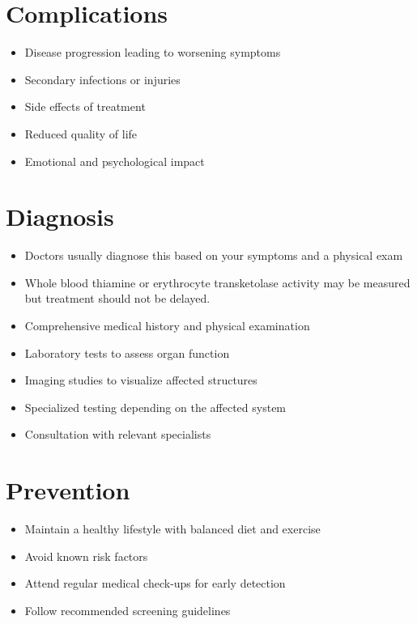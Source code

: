 \section{Complications}
\begin{itemize}[noitemsep]
  \item Disease progression leading to worsening symptoms
  \item Secondary infections or injuries
  \item Side effects of treatment
  \item Reduced quality of life
  \item Emotional and psychological impact
\end{itemize}
\section{Diagnosis}
\begin{itemize}[noitemsep]
  \item Doctors usually diagnose this based on your symptoms and a physical exam
  \item Whole blood thiamine or erythrocyte transketolase activity may be measured but treatment should not be delayed.
  \item Comprehensive medical history and physical examination
  \item Laboratory tests to assess organ function
  \item Imaging studies to visualize affected structures
  \item Specialized testing depending on the affected system
  \item Consultation with relevant specialists
\end{itemize}
\section{Prevention}
\begin{itemize}[noitemsep]
  \item Maintain a healthy lifestyle with balanced diet and exercise
  \item Avoid known risk factors
  \item Attend regular medical check-ups for early detection
  \item Follow recommended screening guidelines
\end{itemize}
